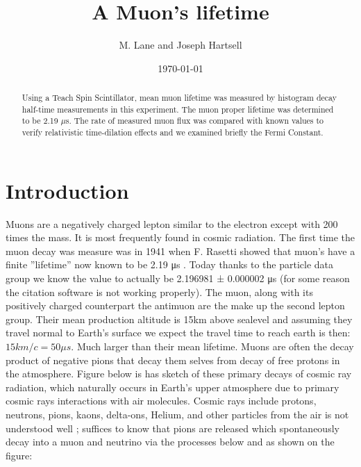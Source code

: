 \documentclass[12pt,twocolumn]{article}
\begin{document}
\title{A Muon's lifetime}
\author{M. Lane and Joseph Hartsell}
\date{\today}

\maketitle


\begin{abstract}
Using a Teach Spin Scintillator, mean muon lifetime was measured by histogram decay half-time measurements in this experiment. The muon proper lifetime was determined to be 2.19 $\mu$s. The rate of measured muon flux was compared with known values to verify relativistic time-dilation effects and we examined briefly the Fermi Constant.
\end{abstract}

\section{Introduction}
 Muons are a negatively charged lepton similar to the electron except with 200 times the mass. It is most frequently found in cosmic radiation.  The first time the muon decay was measure was in 1941 when  F. Rasetti showed that muon’s have a finite ”lifetime” now known to be 2.19 μs \cite{COSBUL}. Today thanks to the particle data group we know the value to actually be 2.196981 ± 0.000002 μs \cite{PDG}  (for some reason the citation software is not working properly). The muon, along with its positively charged counterpart the antimuon are the make up the second lepton group.  Their mean production altitude is 15km above sealevel \cite{PDG} and assuming they travel normal to Earth's surface we expect the travel time to reach earth is then: $15km/c = 50\mu s$. Much larger than their mean lifetime. Muons are often the decay product of negative pions that decay them selves from decay of free protons in the atmosphere. Figure below is has sketch of these primary decays of cosmic ray radiation, which naturally occurs in Earth’s upper atmosphere due to primary cosmic rays interactions with air molecules. Cosmic rays include protons, neutrons, pions, kaons, delta-ons, Helium, and other particles from the air is not understood well \cite{COSBUL}; suffices to know that pions are released which spontaneously decay into a muon and neutrino via the processes below \cite{COSBUL} and as shown on the figure:
\end{document}
